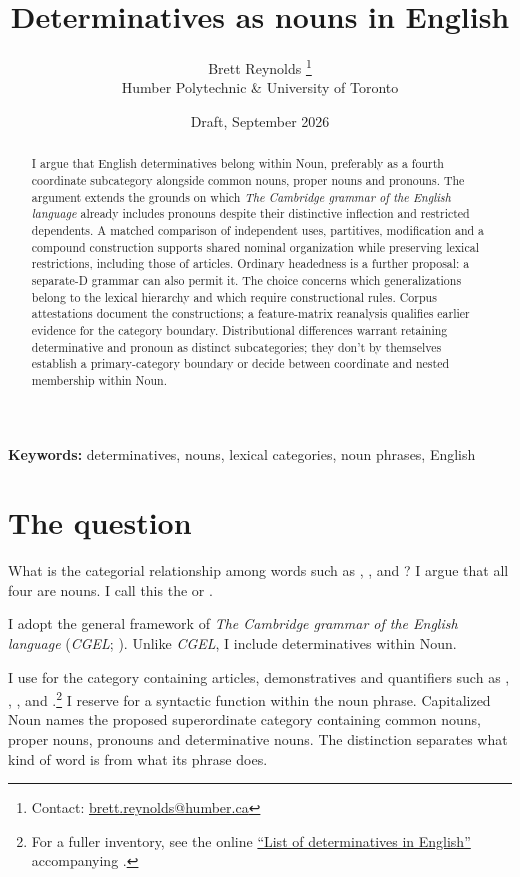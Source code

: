 \documentclass[12pt]{article}
\title{Determinatives as nouns in English}
\author{Brett Reynolds \orcidlink{0000-0003-0073-7195}%
\thanks{Contact: \href{mailto:brett.reynolds@humber.ca}{brett.reynolds@humber.ca}}\\
Humber Polytechnic \& University of Toronto}
\date{Draft, September 2026}
\begin{document}
\maketitle

\begin{abstract}
I argue that English determinatives belong within Noun, preferably as a fourth coordinate subcategory alongside common nouns, proper nouns and pronouns. The argument extends the grounds on which \textit{The Cambridge grammar of the English language} already includes pronouns despite their distinctive inflection and restricted dependents. A matched comparison of independent uses, partitives, modification and a compound construction supports shared nominal organization while preserving lexical restrictions, including those of articles. Ordinary headedness is a further proposal: a separate-D grammar can also permit it. The choice concerns which generalizations belong to the lexical hierarchy and which require constructional rules. Corpus attestations document the constructions; a feature-matrix reanalysis qualifies earlier evidence for the category boundary. Distributional differences warrant retaining determinative and pronoun as distinct subcategories; they don't by themselves establish a primary-category boundary or decide between coordinate and nested membership within Noun.
\end{abstract}

\noindent\textbf{Keywords:} determinatives, nouns, lexical categories, noun phrases, English

\section{The question}\label{sec:intro}

What is the categorial relationship among words such as , ,  and ? I argue that all four are nouns. I call this the  or .

I adopt the general framework of \textit{The Cambridge grammar of the English language} (\textit{CGEL}; \citealt{huddleston2002}). Unlike \textit{CGEL}, I include determinatives within Noun.

I use  for the category containing articles, demonstratives and quantifiers such as , , ,  and .\footnote{For a fuller inventory, see the online \href{https://www.cambridge.org/highereducation/api/resources/2AC8DF5CA558F8A6FCDFACD0EAF8EA08}{\enquote{List of determinatives in English}} accompanying \textcite{Huddleston2021}.} I reserve  for a syntactic function within the noun phrase. Capitalized Noun names the proposed superordinate category containing common nouns, proper nouns, pronouns and determinative nouns. The distinction separates what kind of word  is from what its phrase does.
\end{document}
